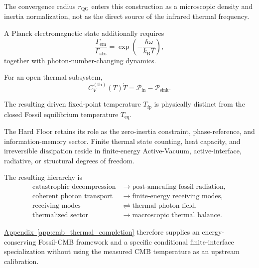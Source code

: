 The convergence radius
\(r_{\mathrm{QG}}\)
enters this construction as a microscopic density and inertia normalization,
not as the direct source of the infrared thermal frequency.

A Planck electromagnetic state additionally requires
\begin{equation}
    \frac{
        \Gamma_{\mathrm{em}}
    }{
        \Gamma_{\mathrm{abs}}
    }
    =
    \exp
    \left(
        -
        \frac{
            \hbar\omega
        }{
            k_{\mathrm B}T
        }
    \right),
    \label{eq:AT_summary_detailed_balance}
\end{equation}
together with photon-number-changing dynamics.

For an open thermal subsystem,
\begin{equation}
    C_V^{(\mathrm{th})}(T)\dot T
    =
    \mathcal P_{\mathrm{in}}
    -
    \mathcal P_{\mathrm{sink}}.
    \label{eq:AT_summary_open_balance}
\end{equation}

The resulting driven fixed-point temperature
\(T_{\mathrm{fp}}\)
is physically distinct from the closed Fossil equilibrium temperature
\(T_{\mathrm{eq}}\).

The Hard Floor retains its role as the zero-inertia constraint,
phase-reference, and information-memory sector. Finite thermal state
counting, heat capacity, and irreversible dissipation reside in finite-energy
Active-Vacuum, active-interface, radiative, or structural degrees of freedom.

The resulting hierarchy is
\begin{equation}
    \begin{aligned}
        \text{catastrophic decompression}
        &\longrightarrow
        \text{post-annealing fossil radiation},
        \\
        \text{coherent photon transport}
        &\longrightarrow
        \text{finite-energy receiving modes},
        \\
        \text{receiving modes}
        &\rightleftharpoons
        \text{thermal photon field},
        \\
        \text{thermalized sector}
        &\longrightarrow
        \text{macroscopic thermal balance}.
    \end{aligned}
    \label{eq:AT_summary_hierarchy}
\end{equation}

\hyperref[app:cmb_thermal_completion]{Appendix~\ref*{app:cmb_thermal_completion}} therefore supplies an energy-conserving Fossil-CMB framework and
a specific conditional finite-interface specialization without using the
measured CMB temperature as an upstream calibration.

